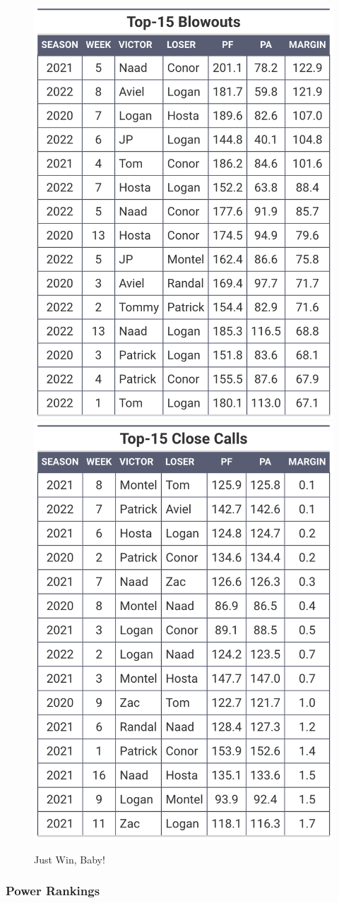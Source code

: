 \documentclass[
]{article}
\begin{document}
\begin{figure}

{\centering \includegraphics[width=0.5\linewidth,height=0.5\textheight]{output/history/blowouts} \includegraphics[width=0.5\linewidth,height=0.5\textheight]{output/history/closecalls} 

}

\caption{Just Win, Baby!}\label{fig:unnamed-chunk-4}
\end{figure}

\hypertarget{power-rankings}{%
\subsubsection{Power Rankings}\label{power-rankings}}
\end{document}
